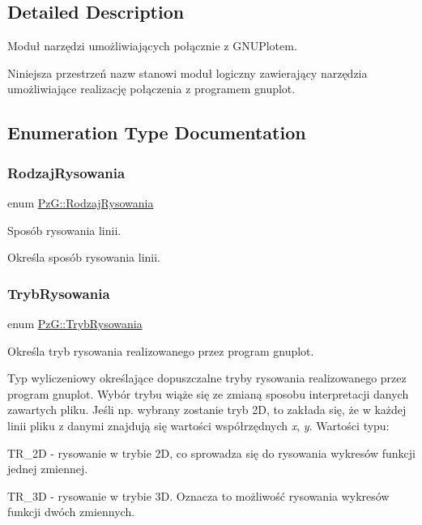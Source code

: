 \subsection{Detailed Description}
Moduł narzędzi umożliwiających połącznie z G\+N\+U\+Plotem. 

Niniejsza przestrzeń nazw stanowi moduł logiczny zawierający narzędzia umożliwiające realizację połączenia z programem {\ttfamily gnuplot}. 

\subsection{Enumeration Type Documentation}
\mbox{\label{namespacePzG_a705c92106f39b7d0c34a6739d10ff0b6}} 
\subsubsection{\texorpdfstring{Rodzaj\+Rysowania}{RodzajRysowania}}
{\footnotesize\ttfamily enum \hyperlink{namespacePzG_a705c92106f39b7d0c34a6739d10ff0b6}{Pz\+G\+::\+Rodzaj\+Rysowania}}



Sposób rysowania linii. 

Określa sposób rysowania linii. \mbox{\label{namespacePzG_aeedae1ef10c66d720f9e89de408ca4ca}} 
\subsubsection{\texorpdfstring{Tryb\+Rysowania}{TrybRysowania}}
{\footnotesize\ttfamily enum \hyperlink{namespacePzG_aeedae1ef10c66d720f9e89de408ca4ca}{Pz\+G\+::\+Tryb\+Rysowania}}



Określa tryb rysowania realizowanego przez program {\ttfamily gnuplot}. 

Typ wyliczeniowy określające dopuszczalne tryby rysowania realizowanego przez program {\ttfamily gnuplot}. Wybór trybu wiąże się ze zmianą sposobu interpretacji danych zawartych pliku. Jeśli np. wybrany zostanie tryb 2D, to zakłada się, że w każdej linii pliku z danymi znajdują się wartości współrzędnych {\itshape x}, {\itshape y}. Wartości typu\+: \begin{DoxyItemize}
\item {\ttfamily T\+R\+\_\+2D} -\/ rysowanie w trybie 2D, co sprowadza się do rysowania wykresów funkcji jednej zmiennej. \item {\ttfamily T\+R\+\_\+3D} -\/ rysowanie w trybie 3D. Oznacza to możliwość rysowania wykresów funkcji dwóch zmiennych. \end{DoxyItemize}
